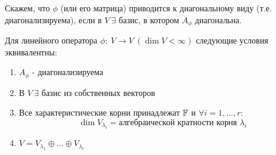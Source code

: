     \begin{definition}
        Скажем, что $\phi$ (или его матрица) приводится к диагональному виду (т.е. диагонализируема), если в $V \ \exists$ базис, в котором $A_\phi$ диагональна.
    \end{definition} 
    \begin{theorem}
        Для линейного оператора $\phi: \ V \to V \ (\dim V < \infty)$ следующие условия эквивалентны:
        \begin{enumerate}
            \item $A_\phi$ - диагонализируема
            \item В $V \ \exists$ базис из собственных векторов
            \item Все характеристические корни принадлежат $\mathbb{F}$ и $\forall i = 1,...,r:$
            $$\dim V_{\lambda_i} = \text{алгебраической кратности корня } \lambda_i$$
            \item $V = V_{\lambda_1} \oplus ... \oplus V_{\lambda_r}$ 
        \end{enumerate}
    \end{theorem}
